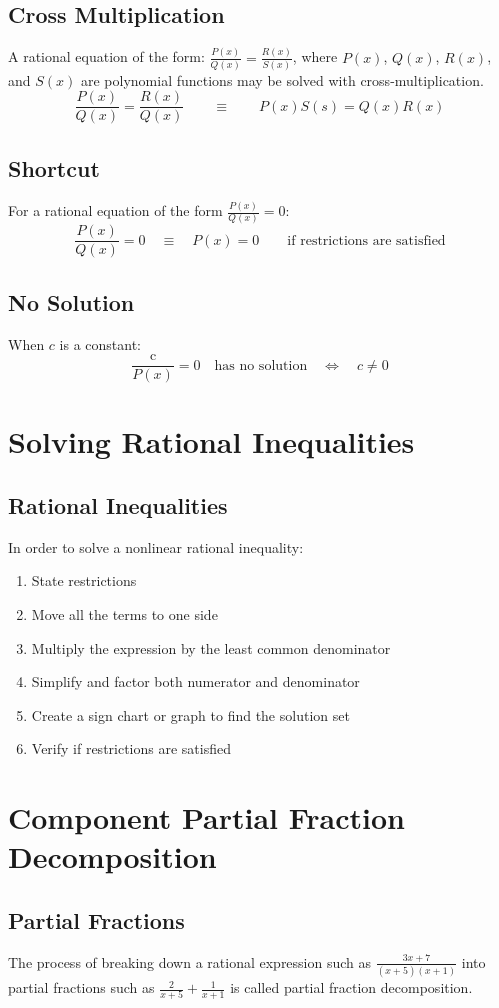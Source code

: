 		\subsection{Cross Multiplication}
			A rational equation of the form: $\frac{P(x)}{Q(x)} = \frac{R(x)}{S(x)}$, where $P(x)$, $Q(x)$, $R(x)$, and $S(x)$ are polynomial functions may be solved with cross-multiplication.
			\[\frac{P(x)}{Q(x)} = \frac{R(x)}{Q(x)} \qquad \equiv \qquad P(x)S(s) = Q(x)R(x)\]
		\subsection{Shortcut}
			For a rational equation of the form $\frac{P(x)}{Q(x)} = 0$:
			\[\frac{P(x)}{Q(x)} = 0 \quad \equiv \quad P(x) = 0 \qquad \text{if restrictions are satisfied}\]
		\subsection{No Solution}
			When $c$ is a constant:
			\[\frac{\text{c}}{P(x)} = 0 \quad \text{has no solution} \quad \iff \quad c \neq 0\]
	\section{Solving Rational Inequalities}
		\subsection{Rational Inequalities}
			In order to solve a nonlinear rational inequality:
			\begin{enumerate}
				\item State restrictions
				\item Move all the terms to one side
				\item Multiply the expression by the least common denominator
				\item Simplify and factor both numerator and denominator
				\item Create a sign chart or graph to find the solution set
				\item Verify if restrictions are satisfied
			\end{enumerate}
	\section{Component Partial Fraction Decomposition}
		\subsection{Partial Fractions}
			The process of breaking down a rational expression such as $\frac{3x+7}{(x+5)(x+1)}$ into partial fractions such as $\frac{2}{x+5} + \frac{1}{x+1}$ is called partial fraction decomposition.

